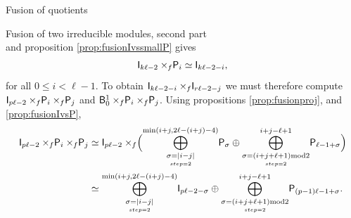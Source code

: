 \documentclass[reqno]{amsart}
\newcommand{\dl}[1]{\mathsf I_{#1}}
\newcommand{\dP}[1]{\mathsf P_{#1}}
\newcommand{\xf}{\times\hspace{-0.27em}_f}
\newcommand{\B}[2]{\mathsf{B}^{#1}_{#2}}
\newcommand{\lc}{\ell}
\begin{document}
\begin{section}{Fusion of quotients}
\begin{subsection}{Fusion of two irreducible modules, second part}
\begin{equation*}
\end{equation*}
and proposition \ref{prop:fusionIvssmallP} gives
\begin{equation*}
\dl{k\lc -2} \xf \dP{i} \simeq \dl{k\lc -2-i},
\end{equation*}
for all $0\leq i <\lc -1$. To obtain $\dl{k \lc -2-i} \xf \dl{r \lc -2 -j}$ we must therefore compute $\dl{p \lc -2} \xf \dP{i}\xf \dP{j}$ and $\B{1}{0}\xf \dP{i} \xf \dP{j}$. Using propositions \ref{prop:fusionproj}, and \ref{prop:fusionIvsP},
\begin{align*}
\dl{p \lc -2} \xf \dP{i} \xf \dP{j} & \simeq  \dl{p \lc -2} \xf \Big(\overset{\min (i+j,2\lc-(i+j)-4)}{\underset{\underset{step=2}{\sigma = |i-j|}}{\bigoplus}}\dP{\sigma} \oplus \overset{i+j -\lc+1}{\underset{\underset{step=2}{\sigma =(i+j+\lc+ 1)\text{mod} 2 }}{\bigoplus}}\dP{\lc -1 +\sigma} \Big)\\
	& \simeq \overset{\min(i+j,2\lc-(i+j)-4)}{\underset{\underset{step=2}{\sigma = |i-j|}}{\bigoplus}}\dl{p \lc -2 - \sigma} \oplus \overset{i+j -\lc+1}{\underset{\underset{step=2}{\sigma =(i+j+\lc+1)\text{mod} 2 }}{\bigoplus}}\dP{(p-1)\lc -1 +\sigma}.
\end{align*}


\end{subsection}
\end{section}
\end{document}
